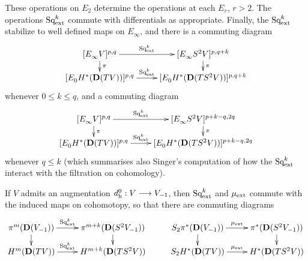 \documentclass[11pt]{amsart}
\theoremstyle{plain}
\theoremstyle{definition}
\renewcommand{\to}{\longrightarrow}
\theoremstyle{plain}
\newcommand{\ExtCohOp}{\textup{Sq}_\textup{ext}}
\newcommand{\ExtCohProd}{\mu_\textup{ext}}
\newcommand{\Sq}{\mathrm{Sq}}
\newcommand{\E}[5]{[E^{#1}_{#2}#3]^{#4}_{#5}}
\newcommand{\dhor}{_\textup{h}}
\newcommand{\dual}{\mathbf{D}}
\begin{document}
\begin{Operations in composite functor spectral sequences}
These operations on $E_2$ determine the operations at each $E_r$, $r>2$. The operations $\ExtCohOp^k$ commute with differentials as appropriate. Finally, the $\ExtCohOp^k$ stabilize to well defined maps on $E_\infty$, and there is a commuting diagram
\[\xymatrix@R=4mm{
\E{}{\infty}{V}{p,q}{}\ar[r]^-{\ExtCohOp^k}\ar[d]^-{\pi}
&%
\E{}{\infty}{S^2V}{p,q+k}{}
\ar[d]^-{\pi}
\\%
\E{}{0}{H^*(\dual(TV))}{p,q}{}\ar[r]^-{\ExtCohOp^k}&%
\E{}{0}{H^*(\dual(TS^2V))}{p,q+k}{}%
}\]
whenever $0\leq k\leq q$, and a commuting diagram
\[\xymatrix@R=4mm{
\E{}{\infty}{V}{p,q}{}\ar[r]^-{\ExtCohOp^k}\ar[d]^-{\pi}
&%
\E{}{\infty}{S^2V}{p+k-q,2q}{}
\ar[d]^-{\pi}
\\%
\E{}{0}{H^*(\dual(TV))}{p,q}{}\ar[r]^-{\ExtCohOp^k}&%
\E{}{0}{H^*(\dual(TS^2V))}{p+k-q,2q}{}%
}\]
whenever $q\leq k$ (which summarises also Singer's computation of how the $\ExtCohOp^k$ interact with the filtration on cohomology).

If $V$ admits an augmentation $d\dhor^0:V\to V_{-1}$, then $\ExtCohOp^k$ and $\ExtCohProd$ commute with the induced maps on cohomotopy, so that there are commuting diagrams %
\[\xymatrix@R=4mm{
\pi^{m}(\dual(V_{-1}))\ar[r]^-{\ExtCohOp^k}
\ar[d]%
&%
\pi^{m+k}(\dual(S^2V_{-1}))\ar[d]%
&%
S_2\pi^{*}(\dual(V_{-1}))\ar[r]^-{\ExtCohProd}
\ar[d]%
&%
\pi^{*}(\dual(S^2V_{-1}))\ar[d]%
\\%
H^{m}(\dual(TV))\ar[r]^-{\ExtCohOp^k}
&%
H^{m+k}(\dual(TS^2V))
&%
S_2H^{*}(\dual(TV))\ar[r]^-{\ExtCohProd}
&%
H^{*}(\dual(TS^2V))
}\]



\end{Operations in composite functor spectral sequences}
\end{document}

